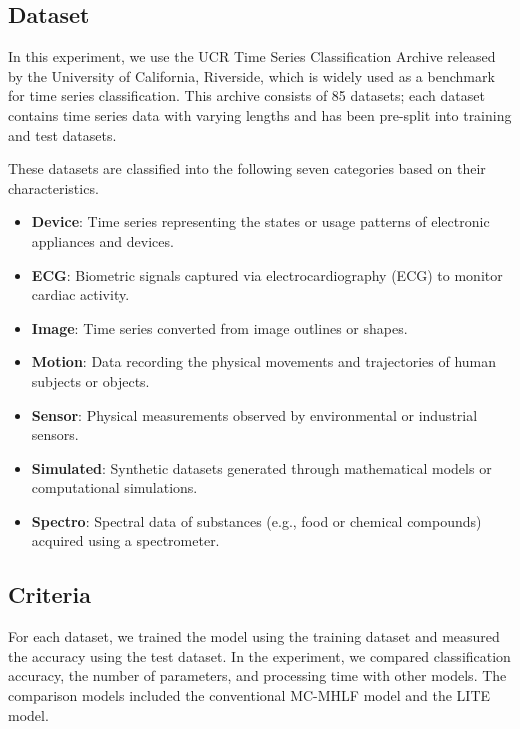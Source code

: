 \documentclass[conference]{IEEEtran}
\begin{document}
\subsection{Dataset}
In this experiment, we use the UCR Time Series Classification Archive released by the University of California, Riverside, which is widely used as a benchmark for time series classification. This archive consists of 85 datasets; each dataset contains time series data with varying lengths and has been pre-split into training and test datasets.


These datasets are classified into the following seven categories based on their characteristics.

\begin{itemize}
    \item \textbf{Device}: Time series representing the states or usage patterns of electronic appliances and devices.
    \item \textbf{ECG}: Biometric signals captured via electrocardiography (ECG) to monitor cardiac activity.
    \item \textbf{Image}: Time series converted from image outlines or shapes.
    \item \textbf{Motion}: Data recording the physical movements and trajectories of human subjects or objects.
    \item \textbf{Sensor}: Physical measurements observed by environmental or industrial sensors.
    \item \textbf{Simulated}: Synthetic datasets generated through mathematical models or computational simulations.
    \item \textbf{Spectro}: Spectral data of substances (e.g., food or chemical compounds) acquired using a spectrometer.
\end{itemize}

\subsection{Criteria}
For each dataset, we trained the model using the training dataset and measured the accuracy using the test dataset. In the experiment, we compared classification accuracy, the number of parameters, and processing time with other models. The comparison models included the conventional MC-MHLF model and the LITE model. 
\end{document}
